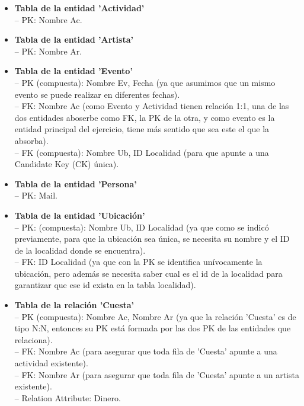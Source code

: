 \documentclass[12pt]{article}
\begin{document}
    \begin{itemize}

        \item \textbf{Tabla de la entidad 'Actividad'} \\
            -- PK: Nombre Ac.
        
        \item \textbf{Tabla de la entidad 'Artista'} \\
            -- PK: Nombre Ar.
            
        \item \textbf{Tabla de la entidad 'Evento'} \\
            -- PK (compuesta): Nombre Ev, Fecha (ya que asumimos que un mismo evento se puede realizar en diferentes fechas). \\
            -- FK: Nombre Ac (como Evento y Actividad tienen relación 1:1, una de las dos entidades aboserbe como FK, la PK 
                de la otra, y como evento es la entidad principal del ejercicio, tiene más sentido que sea este el que la absorba). \\
            -- FK (compuesta): Nombre Ub, ID Localidad (para que apunte a una Candidate Key (CK) única).
            
        \item \textbf{Tabla de la entidad 'Persona'} \\
            -- PK: Mail.
            
        \item \textbf{Tabla de la entidad 'Ubicación'} \\
            -- PK: (compuesta): Nombre Ub, ID Localidad (ya que como se indicó previamente, para que la ubicación sea única, se necesita su nombre y 
            el ID de la localidad donde se encuentra). \\
            -- FK: ID Localidad (ya que con la PK se identifica unívocamente la ubicación, pero además se necesita saber cual es el id de la localidad 
            para garantizar que ese id exista en la tabla localidad).
            
        \item \textbf{Tabla de la relación 'Cuesta'} \\
            -- PK (compuesta): Nombre Ac, Nombre Ar (ya que la relación 'Cuesta' es de tipo N:N, entonces su PK está formada por las dos PK de las 
            entidades que relaciona). \\
            -- FK: Nombre Ac (para asegurar que toda fila de 'Cuesta' apunte a una actividad existente). \\
            -- FK: Nombre Ar (para asegurar que toda fila de 'Cuesta' apunte a un artista existente). \\
            -- Relation Attribute: Dinero.
            

\end{itemize}
\end{document}
